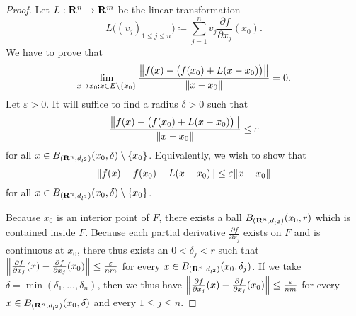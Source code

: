 \begin{proof}
    Let \(L : \R^n \to \R^m\) be the linear transformation
    \[
        L\big((v_j)_{1 \leq j \leq n}\big) \coloneqq \sum_{j = 1}^n v_j \frac{\partial f}{\partial x_j}(x_0).
    \]
    We have to prove that
    \[
        \lim_{x \to x_0 ; x \in E \setminus \{x_0\}} \frac{\norm*{f(x) - \big(f(x_0) + L(x - x_0)\big)}}{\norm*{x - x_0}} = 0.
    \]
    Let \(\varepsilon > 0\).
    It will suffice to find a radius \(\delta > 0\) such that
    \[
        \frac{\norm*{f(x) - \big(f(x_0) + L(x - x_0)\big)}}{\norm*{x - x_0}} \leq \varepsilon
    \]
    for all \(x \in B_{(\R^n, d_{l^2})}(x_0, \delta) \setminus \{x_0\}\).
    Equivalently, we wish to show that
    \[
        \norm*{f(x) - f(x_0) - L(x - x_0)} \leq \varepsilon \norm*{x - x_0}
    \]
    for all \(x \in B_{(\R^n, d_{l^2})}(x_0, \delta) \setminus \{x_0\}\).

    Because \(x_0\) is an interior point of \(F\), there exists a ball \(B_{(\R^n, d_{l^2})}(x_0, r)\) which is contained inside \(F\).
    Because each partial derivative \(\frac{\partial f}{\partial x_j}\) exists on \(F\) and is continuous at \(x_0\), there thus exists an \(0 < \delta_j < r\) such that \(\norm*{\frac{\partial f}{\partial x_j}(x) - \frac{\partial f}{\partial x_j}(x_0)} \leq \frac{\varepsilon}{nm}\) for every \(x \in B_{(\R^n, d_{l^2})}(x_0, \delta_j)\).
    If we take \(\delta = \min(\delta_1, \dots, \delta_n)\), then we thus have \(\norm*{\frac{\partial f}{\partial x_j}(x) - \frac{\partial f}{\partial x_j}(x_0)} \leq \frac{\varepsilon}{nm}\) for every \(x \in B_{(\R^n, d_{l^2})}(x_0, \delta)\) and every \(1 \leq j \leq n\).


\end{proof}
